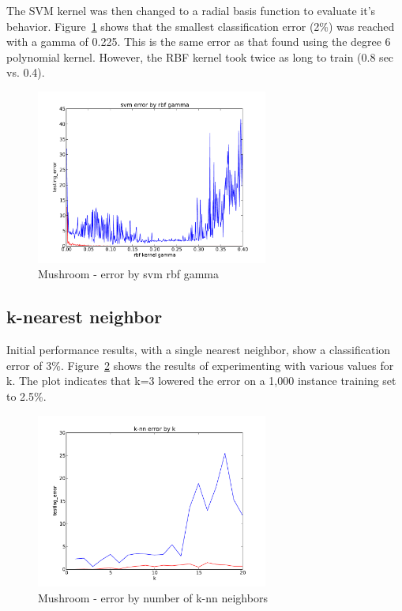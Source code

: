 \documentclass{sig-alternate}
\begin{document}
The SVM kernel was then changed to a radial basis function to evaluate it's behavior. Figure~\ref{ag-svm-rbf} shows that the smallest classification error (2\%) was reached with a gamma of 0.225. This is the same error as that found using the degree 6 polynomial kernel. However, the RBF kernel took twice as long to train (0.8 sec vs. 0.4).

\begin{figure}[!htbp]
    \centering
    \includegraphics[width=3in]{data/agaricus-lepiota/svm/rbf.pdf}
    \caption{Mushroom - error by svm rbf gamma\label{ag-svm-rbf}}
\end{figure} 

\subsection{k-nearest neighbor}

Initial performance results, with a single nearest neighbor, show a classification error of 3\%. Figure~\ref{ag-knn-k} shows the results of experimenting with various values for k. The plot indicates that k=3 lowered the error on a 1,000 instance training set to 2.5\%. 

\begin{figure}[!htbp]
    \centering
    \includegraphics[width=3in]{data/agaricus-lepiota/k-nn/k.pdf}
    \caption{Mushroom - error by number of k-nn neighbors\label{ag-knn-k}}
\end{figure} 
\end{document}
